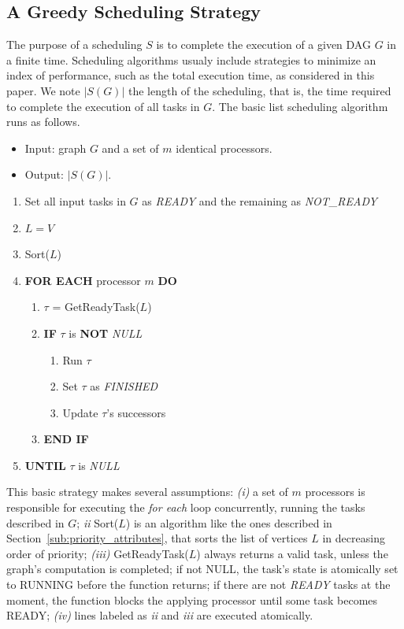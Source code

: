 \documentclass[twocolumn]{svjour3}
\begin{document}
\subsection{A Greedy Scheduling Strategy}

The purpose of a scheduling $S$ is to complete the execution of a given DAG $G$ in a finite time. Scheduling algorithms usualy include strategies to minimize an index of performance, such as the total execution time, as considered in this paper. We note $|S(G)|$ the length of the scheduling, that is, the time required to complete the execution of all tasks in $G$. The basic list scheduling algorithm runs as follows.

{\small
\begin{itemize}
\item Input: graph $G$ and a set of $m$ identical processors.
\item Output: $|S(G)|$.
\end{itemize}
\begin{enumerate}
\item Set all input tasks in $G$ as \emph{READY} and the remaining as \emph{NOT\_READY}
\item $L = V$
\item Sort($L$)
\item \textbf{FOR EACH} processor $m$ \textbf{DO}
   \begin{enumerate}
		\item $\tau$ = GetReadyTask($L$)
		\item \textbf{IF} $\tau$ is \textbf{NOT} \emph{NULL}
            \begin{enumerate}
              \item Run $\tau$
              \item Set $\tau$ as \emph{FINISHED}
			  \item Update $\tau$'s successors
            \end{enumerate}
		\item \textbf{END IF}
   \end{enumerate}
\item \textbf{UNTIL} $\tau$ is \emph{NULL}
\end{enumerate}
}

This basic strategy makes several assumptions: \emph{(i)} a set of $m$ processors is responsible for executing the \emph{for each} loop concurrently, running the tasks described in $G$; \emph{ii} Sort($L$) is an algorithm like the ones described in Section~\ref{sub:priority_attributes}, that sorts the list of vertices $L$ in decreasing order of priority; \emph{(iii)} GetReadyTask($L$) always returns a valid task, unless the graph's computation is completed; if not NULL, the task's state is atomically set to RUNNING before the function returns; if there are not \emph{READY} tasks at the moment, the function blocks the applying processor until some task becomes READY; \emph{(iv)} lines labeled as \emph{ii} and \emph{iii} are executed atomically. 
\end{document}
